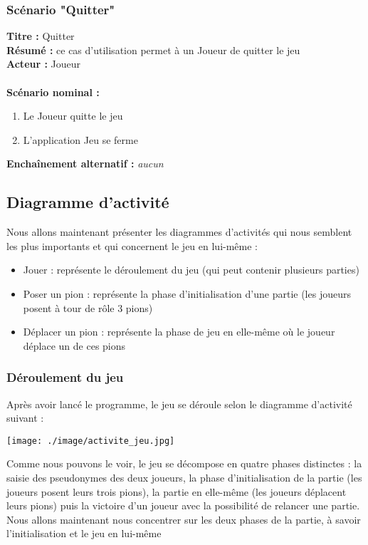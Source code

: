 \documentclass[12pt , a4paper]{article}
\begin{document}
\subsubsection{Scénario "Quitter"}
\noindent\textbf{Titre : } Quitter\\
\textbf{Résumé : } ce cas d'utilisation permet à un Joueur de quitter le jeu\\
\textbf{Acteur : } Joueur\\ \\
\textbf{Scénario nominal :}
\begin{enumerate}
\item Le Joueur quitte le jeu
\item L'application Jeu se ferme
\end{enumerate}
\textbf{Encha\^inement alternatif :} \textit{aucun}\\

\subsection{Diagramme d'activité}
\noindent Nous allons maintenant présenter les diagrammes d'activités qui nous semblent les plus importants et qui concernent le jeu en lui-même :
\begin{itemize}
	\item Jouer : représente le déroulement du jeu (qui peut contenir plusieurs parties)
	\item Poser un pion : représente la phase d'initialisation d'une partie (les joueurs posent à tour de rôle 3 pions)
	\item Déplacer un pion : représente la phase de jeu en elle-même où le joueur déplace un de ces pions
\end{itemize}

\subsubsection{Déroulement du jeu}
\noindent Après avoir lancé le programme, le jeu se déroule selon le diagramme d'activité suivant : 
\begin{landscape}
	\begin{center}
	  \texttt{[image: ./image/activite\_jeu.jpg]}
	\end{center}
\end{landscape}	
\noindent Comme nous pouvons le voir, le jeu se décompose en quatre phases distinctes : la saisie des pseudonymes des deux joueurs, la phase d'initialisation de la partie (les joueurs posent leurs trois pions), la partie en elle-même (les joueurs déplacent leurs pions) puis la victoire d'un joueur avec la possibilité de relancer une partie. \\
Nous allons maintenant nous concentrer sur les deux phases de la partie, à savoir l'initialisation et le jeu en lui-m\^eme
	
\end{document}
